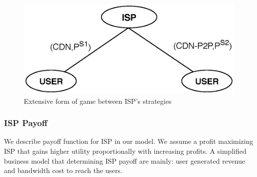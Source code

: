 \documentclass[paper]{ieice}
\begin{document}
\begin{figure}[tb] 
\begin{center}
\includegraphics[scale=0.5]{graphs/game-tree-2.eps}
\end{center}
\caption{Extensive form of game between ISP's strategies}
\label{fig:gametree}
\vspace{-2mm}
\end{figure}

\subsubsection{ISP Payoff}
We describe payoff function for ISP in our model.  
We assume a profit maximizing ISP that gains higher utility proportionally with increasing profits. 
A simplified business model that determining ISP payoff are mainly: user generated revenue and bandwidth cost to reach the users.
\end{document}
